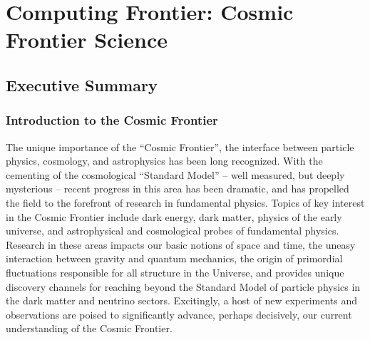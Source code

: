  
\chapter{Computing Frontier: Cosmic Frontier Science}
\label{chap:mag}


\begin{center}\begin{boldmath}

%

\end{boldmath}\end{center}


\section{Executive Summary}
\label{sec:comp-exec}

\subsection{Introduction to the Cosmic Frontier}

The unique importance of the ``Cosmic Frontier'', the interface
between particle physics, cosmology, and astrophysics has been long
recognized. With the cementing of the cosmological ``Standard Model''
-- well measured, but deeply mysterious -- recent progress in this
area has been dramatic, and has propelled the field to the forefront
of research in fundamental physics. Topics of key interest in the
Cosmic Frontier include dark energy, dark matter, physics of the early
universe, and astrophysical and cosmological probes of fundamental
physics. Research in these areas impacts our basic notions of space
and time, the uneasy interaction between gravity and quantum
mechanics, the origin of primordial fluctuations responsible for all
structure in the Universe, and provides unique discovery channels for
reaching beyond the Standard Model of particle physics in the dark
matter and neutrino sectors. Excitingly, a host of new experiments and
observations are poised to significantly advance, perhaps decisively,
our current understanding of the Cosmic Frontier.

